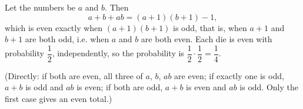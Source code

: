 Let the numbers be $a$ and $b$. Then
\[a+b+ab=(a+1)(b+1)-1,\]
which is even exactly when $(a+1)(b+1)$ is odd, that is, when $a+1$ and $b+1$ are both odd, i.e. when $a$ and $b$ are both even. Each die is even with probability $\dfrac12$, independently, so the probability is $\dfrac12\cdot\dfrac12=\boxed{\dfrac14}$.

(Directly: if both are even, all three of $a$, $b$, $ab$ are even; if exactly one is odd, $a+b$ is odd and $ab$ is even; if both are odd, $a+b$ is even and $ab$ is odd. Only the first case gives an even total.)
